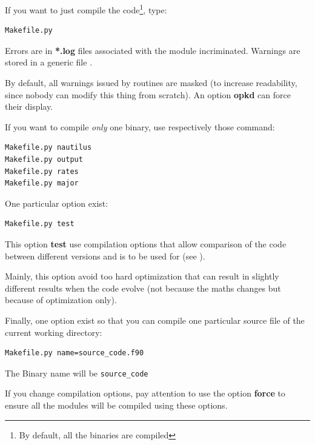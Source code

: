 \documentclass[english,a4paper,twoside]{article}
\begin{document}
If you want to just compile the code\footnote{By default, all the binaries are compiled}, type:
\begin{verbatim}
Makefile.py
\end{verbatim}

\begin{remarque}
Errors are in \textbf{*.log} files associated with the module incriminated. Warnings are stored in a generic file .
\end{remarque}

\begin{attention}
By default, all warnings issued by  routines are masked (to increase readability, since nobody can modify this thing from scratch). An option \textbf{opkd} can force their display.
\end{attention}

If you want to compile \emph{only} one binary, use respectively those command:
\begin{verbatim}
Makefile.py nautilus
Makefile.py output
Makefile.py rates
Makefile.py major
\end{verbatim}

\bigskip

One particular option exist:
\begin{verbatim}
Makefile.py test
\end{verbatim}
This option \textbf{test} use compilation options that allow comparison of the code between different versions and is to be used for  (see ). 

\begin{remarque}
Mainly, this option avoid too hard optimization that can result in slightly different results when the code evolve (not because the maths changes but because of optimization only).
\end{remarque}

Finally, one option exist so that you can compile one particular source file of the current working directory:
\begin{verbatim}
Makefile.py name=source_code.f90
\end{verbatim}
The Binary name will be \verb|source_code|

\begin{attention}
If you change compilation options, pay attention to use the option \textbf{force} to ensure all the modules will be compiled using these options.
\end{attention}
\end{document}
